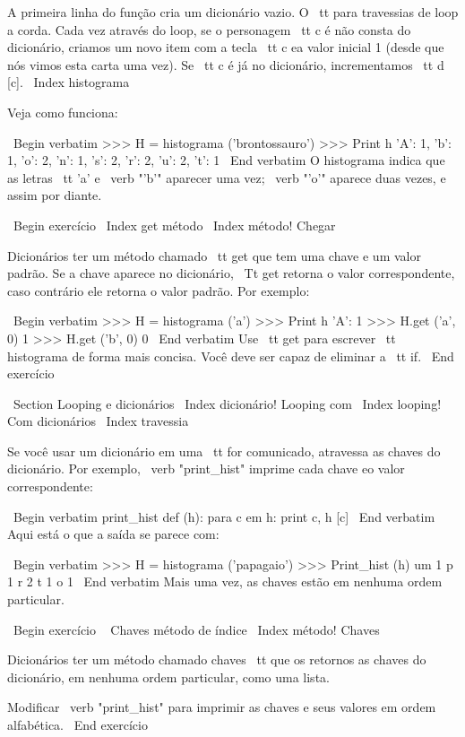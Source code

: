 \documentclass[10pt]{book}
\begin{document}
\begin {itemize}
{{{{{{{A primeira linha do
função cria um dicionário vazio. O {\ tt para} travessias de loop
a corda. Cada vez através do loop, se o personagem {\ tt c} é
não consta do dicionário, criamos um novo item com a tecla {\ tt c} ea
valor inicial 1 (desde que nós vimos esta carta uma vez). Se {\ tt c} é
já no dicionário, incrementamos {\ tt d [c]}.
\ Index {} histograma

Veja como funciona:

\ Begin {verbatim}
>>> H = histograma ('brontossauro')
>>> Print h
{'A': 1, 'b': 1, 'o': 2, 'n': 1, 's': 2, 'r': 2, 'u': 2, 't': 1}
\ End {verbatim}
%
O histograma indica que as letras {\ tt 'a'} e \ verb "'b'"
aparecer uma vez; \ verb "'o'" aparece duas vezes, e assim por diante.

\ Begin {} exercício
\ Index {get método}
\ Index {método! Chegar}

Dicionários ter um método chamado {\ tt get} que tem uma chave
e um valor padrão. Se a chave aparece no dicionário,
{\ Tt get} retorna o valor correspondente, caso contrário ele retorna
o valor padrão. Por exemplo:

\ Begin {verbatim}
>>> H = histograma ('a')
>>> Print h
{'A': 1}
>>> H.get ('a', 0)
1
>>> H.get ('b', 0)
0
\ End {verbatim}
%
Use {\ tt get} para escrever {\ tt histograma} de forma mais concisa. Você
deve ser capaz de eliminar a {\ tt if}.
\ End {} exercício


\ Section {Looping e dicionários}
\ Index {dicionário! Looping com}
\ Index {looping! Com dicionários}
\ Index {travessia}

Se você usar um dicionário em uma {\ tt for} comunicado, atravessa
as chaves do dicionário. Por exemplo, \ verb "print_hist"
imprime cada chave eo valor correspondente:

\ Begin {verbatim}
print_hist def (h):
    para c em h:
        print c, h [c]
\ End {verbatim}
%
Aqui está o que a saída se parece com:

\ Begin {verbatim}
>>> H = histograma ('papagaio')
>>> Print_hist (h)
um 1
p 1
r 2
t 1
o 1
\ End {verbatim}
%
Mais uma vez, as chaves estão em nenhuma ordem particular.

\ Begin {} exercício
\ {} Chaves método de índice
\ Index {método! Chaves}

Dicionários ter um método chamado {chaves \ tt} que os retornos
as chaves do dicionário, em nenhuma ordem particular, como uma lista.

Modificar \ verb "print_hist" para imprimir as chaves e seus valores
em ordem alfabética.
\ End {} exercício



}}}}}}}
\end{itemize}
\end{document}
